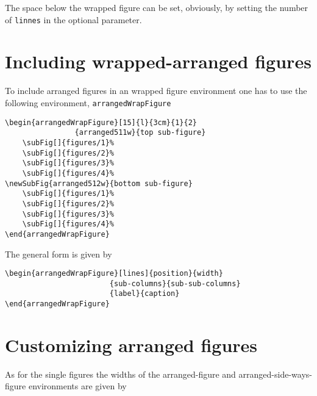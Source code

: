 \documentclass[12pt,a4paper]{article}
\newcommand{\comm}[1]{\texttt{#1}}
\begin{document}
The space below the wrapped figure can be set, obviously, by setting
the number of \comm{linnes} in the optional parameter.








\section{Including wrapped-arranged figures}


To include arranged figures in an wrapped figure environment one has to use the 
following environment, \comm{arrangedWrapFigure}

\begin{verbatim}
\begin{arrangedWrapFigure}[15]{l}{3cm}{1}{2}
                {arranged511w}{top sub-figure}
    \subFig[]{figures/1}%
    \subFig[]{figures/2}%
    \subFig[]{figures/3}%
    \subFig[]{figures/4}%
\newSubFig{arranged512w}{bottom sub-figure}
    \subFig[]{figures/1}%
    \subFig[]{figures/2}%
    \subFig[]{figures/3}%
    \subFig[]{figures/4}%
\end{arrangedWrapFigure}
\end{verbatim}

The general form is given by

\begin{verbatim}
\begin{arrangedWrapFigure}[lines]{position}{width}
                        {sub-columns}{sub-sub-columns}
                        {label}{caption}
\end{arrangedWrapFigure}
\end{verbatim}









\clearpage









\section{Customizing arranged figures}

As for the single figures the widths of the arranged-figure and
arranged-side-ways-figure environments are given by
\end{document}
